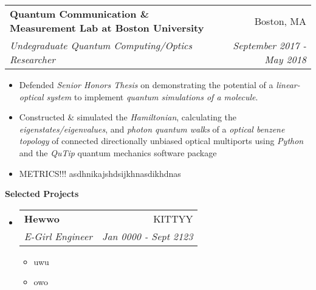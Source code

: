 \documentclass[letterpaper, 8pt]{extarticle}
\makeatletter
\newcommand{\resitem}[1]{\item #1 \vspace{-2pt}}
\newcommand{\resheading}[1]{{\large \colorbox{mygrey}{\begin{minipage}{0.99\textwidth}{\textbf{#1 \vphantom{p\^{E}}}}\end{minipage}}}}
\newcommand{\ressubheading}[4]{
\begin{tabular*}{7.40in}{l@{\extracolsep{\fill}}r}
		\textbf{#1} & #2 \\
		\textit{#3} & \textit{#4} \\
\end{tabular*}\vspace{-6pt}}
\makeatother
\begin{document}
\begin{itemize}
	\ressubheading{Quantum Communication \& Measurement Lab at Boston University}{Boston, MA}{Undegraduate Quantum Computing/Optics Researcher}{September 2017 - May 2018}
	\begin{itemize}
	    \resitem{Defended \emph{Senior Honors Thesis} on demonstrating the potential of a \emph{linear-optical system} to implement \emph{quantum simulations of a molecule}.}
        \resitem{Constructed \& simulated the \emph{Hamiltonian}, calculating the \emph{eigenstates/eigenvalues}, and \emph{photon quantum walks} of a \emph{optical benzene topology} of connected directionally unbiased optical multiports using \emph{Python} and the \emph{QuTip} quantum mechanics software package}
        \item{METRICS!!!   asdhnikajshdsijkhnasdikhdnas }
	\end{itemize}



\end{itemize}



\resheading{Selected Projects}



\begin{itemize}
\setlength{\leftmargini}{0.5em}
\item
	\ressubheading{Hewwo}{KITTYY}{E-Girl Engineer}{Jan 0000 - Sept 2123}
	\begin{itemize}
		\resitem{uwu}
        \resitem{owo}
	\end{itemize}

\end{itemize}
\end{document}
